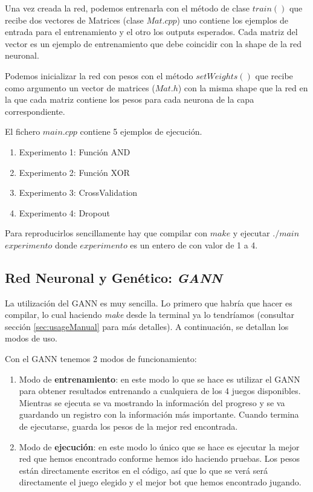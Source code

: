 Una vez creada la red, podemos entrenarla con el método de clase $train()$ que recibe dos vectores de Matrices (clase $Mat.cpp$) uno contiene los ejemplos de entrada para el entrenamiento y el otro los outputs esperados. Cada matriz del vector es un ejemplo de entrenamiento que debe coincidir con la shape de la red neuronal.

Podemos inicializar la red con pesos con el método $setWeights()$ que recibe como argumento un vector de matrices ($Mat.h$) con la misma shape que la red en la que cada matriz contiene los pesos para cada neurona de la capa correspondiente.  

El fichero $main.cpp$ contiene 5 ejemplos de ejecución.

\begin{enumerate}
    \item Experimento 1: Función AND 
    \item Experimento 2: Función XOR
    \item Experimento 3: CrossValidation
    \item Experimento 4: Dropout
\end{enumerate}

Para reproducirlos sencillamente hay que compilar con $make$ y ejecutar $./main$ $experimento$ donde $experimento$ es un entero de con valor de 1 a 4.

\newpage
\subsection{Red Neuronal y Genético: \textit{GANN}}

La utilización del GANN es muy sencilla. Lo primero que habría que hacer es compilar, lo cual haciendo \textit{make} desde la terminal ya lo tendríamos (consultar sección \ref{sec:usageManual} para más detalles). A continuación, se detallan los modos de uso.

Con el GANN tenemos 2 modos de funcionamiento:

\begin{enumerate}
    \item Modo de \textbf{entrenamiento}: en este modo lo que se hace es utilizar el GANN para obtener resultados entrenando a cualquiera de los 4 juegos disponibles. Mientras se ejecuta se va mostrando la información del progreso y se va guardando un registro con la información más importante. Cuando termina de ejecutarse, guarda los pesos de la mejor red encontrada.
    \item Modo de \textbf{ejecución}: en este modo lo único que se hace es ejecutar la mejor red que hemos encontrado conforme hemos ido haciendo pruebas. Los pesos están directamente escritos en el código, así que lo que se verá será directamente el juego elegido y el mejor bot que hemos encontrado jugando.
\end{enumerate}

